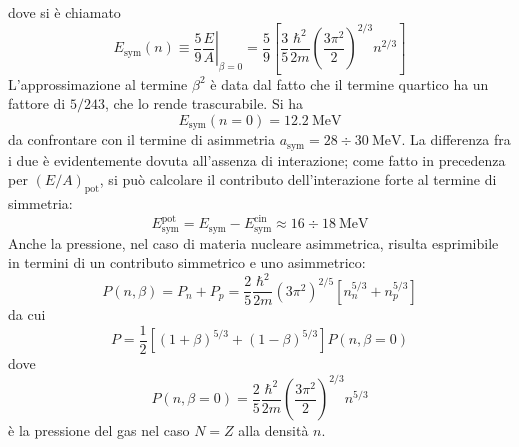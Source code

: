 \documentclass[11pt, a4paper]{scrartcl}
\theoremstyle{style}
\newcommand*\Eval[3]{\left.#1\right\rvert_{#2}^{#3}}
\numberwithin{equation}{subsection}
\begin{document}
dove si \`e chiamato
\[
E_\text{sym}(n) \equiv \frac{5}{9} \Eval{\frac{E}{A}}{\beta =0}{} = \frac{5}{9} \left[ \frac{3}{5} \frac{\hbar ^2}{2m} \left(\frac{3\pi^2}{2}\right)^{2 / 3} n^{2 / 3}  \right] 
\] 
L'approssimazione al termine $\beta ^2$ \`e data dal fatto che il termine quartico ha un fattore di $5 / 243$, che lo rende trascurabile.
Si ha
\[
E_\text{sym}(n=0) = 12.2~\text{MeV}
\] 
da confrontare con il termine di asimmetria $a_\text{sym}=28\div 30~\text{MeV}$.
La differenza fra i due \`e evidentemente dovuta all'assenza di interazione; come fatto in precedenza per $(E / A)_\text{pot}$, si pu\`o calcolare il contributo dell'interazione forte al termine di simmetria:
\[
E_\text{sym}^\text{pot} = E_\text{sym} - E_\text{sym}^\text{cin} \approx 16\div 18~\text{MeV}
\] 
Anche la pressione, nel caso di materia nucleare asimmetrica, risulta esprimibile in termini di un contributo simmetrico e uno asimmetrico:
\[
P(n,\beta ) = P_n + P_p = \frac{2}{5} \frac{\hbar ^2}{2m} (3\pi^2)^{2 / 5} \left[ n_n^{5 / 3} + n_p ^{5 / 3} \right] 
\] 
da cui
\begin{equation}
	P = \frac{1}{2} \left[ \left(1+\beta \right) ^{5 / 3} + \left(1 - \beta \right) ^{5 / 3} \right] P (n,\beta =0)
\end{equation}
dove
\[
P(n,\beta =0) = \frac{2}{5} \frac{\hbar ^2}{2m}\left(\frac{3\pi^2}{2}\right) ^{2  /3} n^{5 / 3}
\] 
\`e la pressione del gas nel caso $N=Z$ alla densit\`a $n$.
\end{document}
